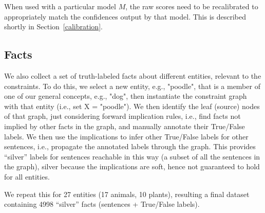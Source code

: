 \documentclass[11pt]{article}
\newcommand{\nk}[1]{\textcolor{green}{Nora: #1}}
\newcommand{\eat}[1]{}
\begin{document}
When used with a particular model $M$, the raw scores need to be recalibrated
to appropriately match the confidences output by that model. This is described shortly in Section~\ref{calibration}.

\subsection{Facts}

We also collect a set of truth-labeled facts about different entities, relevant to the constraints.
To do this, we select a new entity, e.g., "poodle", that is a member of one of our general concepts,
e.g., "dog", then instantiate the constraint graph with that
entity (i.e., set X = "poodle"). We then identify the leaf (source) nodes of that graph, just considering
forward implication rules, i.e., find facts not implied by other facts in the graph, and manually
annotate their True/False labels. We then use the implications to infer
other True/False labels for other sentences, i.e., propagate the annotated labels through the graph.
This provides ``silver'' labels for sentences reachable in this way (a subset of all the sentences 
in the graph), silver because the implications are soft, hence not guaranteed to hold for all entities. 

We repeat this for 27 entities (17 animals, 10 plants), resulting
a final dataset containing 4998 ``silver'' facts (sentences + True/False labels).
\eat{Note that each slice is independent and can be processed separately.
As described shortly, we perform our experiments with each slice in turn
and average results.}


\eat{
\subsection{Query and sentence templates}
\nk{Not sure where to put this section}
In order to query the model for its belief we manually define template queries for each relation, e.g., for the IsA relation the template query "Is X a Y?" is used.
These template queries are then instantiated for each sentence of the constraint set by filling in the relevant objects Y, e.g., "Is X a dog?".

We then query the model's beliefs involving an entities of the test set by filling in the subject slot X, e.g., "Is a poodle a dog?".

We also define an additional set of sentence templates, e.g., "X is Y." which are used to feed back beliefs into the context window of the model.
}
\end{document}
